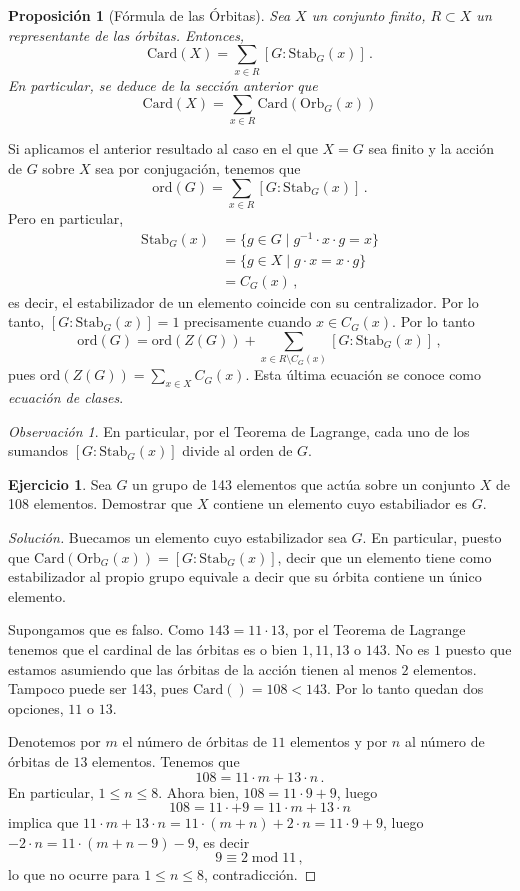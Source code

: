 \documentclass[a4paper,11pt]{amsart}
\theoremstyle{plain}
\newtheorem{prop}[thm]{Proposición}
\theoremstyle{definition}
\newtheorem{ejercicio}[thm]{Ejercicio}
\theoremstyle{remark}
\newtheorem*{rem}{Observación}
\newenvironment{solution}
  {\begin{proof}[Solución]}
  {\end{proof}}
\begin{document}
\begin{prop}[Fórmula de las Órbitas]
Sea $X$ un conjunto finito, $R \subset X$ un representante de las órbitas. Entonces, 
\[ \text{Card}(X) = \sum_{x \in R}[G : \text{Stab}_G(x)] \, . \]
En particular, se deduce de la sección anterior que 
\[ \text{Card}(X) = \sum_{x \in R}\text{Card}(\text{Orb}_G(x))\]
\end{prop}


Si aplicamos el anterior resultado al caso en el que $X = G$ sea finito y la acción de $G$ sobre $X$ sea por conjugación, tenemos que 
\[ \text{ord}(G) = \sum_{x \in R}[G : \text{Stab}_G(x)] \, . \]
Pero en particular, 
\begin{align*}
    \text{Stab}_G(x) & = \{ g \in G \mid g^{-1} \cdot x \cdot g = x \} \\
    & = \{ g \in X \mid g \cdot x = x \cdot g\} \\
    & = C_G(x) \, ,
\end{align*}
es decir, el estabilizador de un elemento coincide con su centralizador. Por lo tanto, $[G : \text{Stab}_G(x)] = 1$ precisamente cuando $x \in C_G(x)$. Por lo tanto 
\[ \text{ord}(G) = \text{ord}(Z(G)) + \sum_{x \in R \setminus C_G(x)} [ G : \text{Stab}_G(x)] \, ,\]
pues $\text{ord}(Z(G)) = \sum_{x \in X}C_G(x)$. Esta última ecuación se conoce como \textit{ecuación de clases}. 

\begin{rem}
En particular, por el Teorema de Lagrange, cada uno de los sumandos $[G : \text{Stab}_G(x)]$ divide al orden de $G$.
\end{rem}

\begin{ejercicio}
Sea $G$ un grupo de 143 elementos que actúa sobre un conjunto $X$ de 108 elementos. Demostrar que $X$ contiene un elemento cuyo estabiliador es $G$. 
\end{ejercicio}


\begin{solution}
Buecamos un elemento cuyo estabilizador sea $G$. En particular, puesto que $\text{Card}(\text{Orb}_G(x)) = [G : \text{Stab}_G(x)]$, decir que un elemento tiene como estabilizador al propio grupo equivale a decir que su órbita contiene un único elemento.

Supongamos que es falso. Como $143 = 11 \cdot 13$, por el Teorema de Lagrange tenemos que el cardinal de las órbitas es o bien $1, 11, 13$ o $143$. No es $1$ puesto que estamos asumiendo que las órbitas de la acción tienen al menos $2$ elementos. Tampoco puede ser 143, pues $\text{Card}() = 108 < 143$. Por lo tanto quedan dos opciones, $11$ o $13$. 

Denotemos por $m$ el número de órbitas de $11$ elementos y por $n$ al número de órbitas de $13$ elementos. Tenemos que 
\[ 108 = 11 \cdot m + 13 \cdot n \, . \]
En particular, $1 \leq n \leq 8$. Ahora bien, $108 = 11 \cdot 9 + 9$, luego 
\[ 108 = 11 \cdot + 9 = 11 \cdot m + 13 \cdot n \]
implica que $11 \cdot m + 13 \cdot n = 11 \cdot (m + n) + 2 \cdot n = 11 \cdot 9 + 9$, luego $-2 \cdot n = 11 \cdot (m + n - 9) - 9$, es decir 
\[ 9 \equiv 2 \; \text{mod} \; 11 \, ,\]
lo que no ocurre para $1 \leq n \leq 8$, contradicción.
\end{solution}
\end{document}

